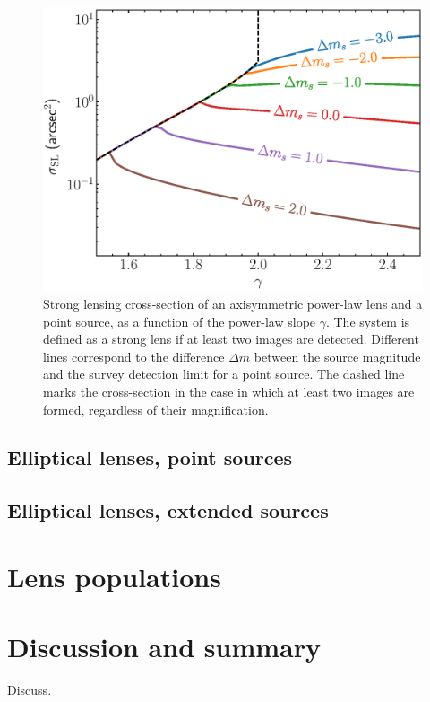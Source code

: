 \documentclass{aa}
\begin{document}
\begin{figure}
\includegraphics[width=\columnwidth]{axisymm_pl_crosssect.eps}
\caption{
Strong lensing cross-section of an axisymmetric power-law lens and a point source, as a function of the power-law slope $\gamma$.
The system is defined as a strong lens if at least two images are detected.
Different lines correspond to the difference $\Delta m$ between the source magnitude and the survey detection limit for a point source.
The dashed line marks the cross-section in the case in which at least two images are formed, regardless of their magnification.
}
\end{figure}

\subsection{Elliptical lenses, point sources}

\subsection{Elliptical lenses, extended sources}


\section{Lens populations}\label{sect:lenspop}



\section{Discussion and summary}\label{sect:discuss}

Discuss.






\end{document}
